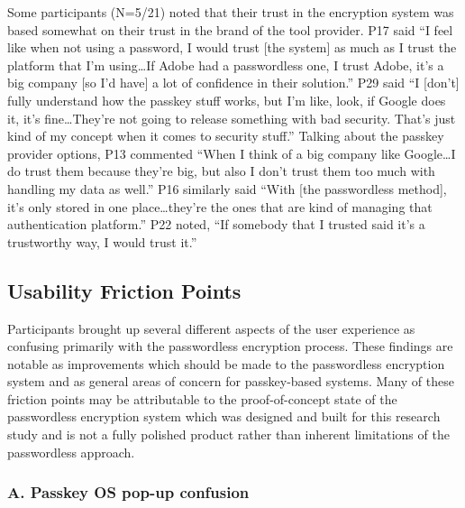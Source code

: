 Some participants (N=5/21) noted that their trust in the encryption system was based somewhat on their trust in the brand of the tool provider. P17 said ``I feel like when not using a password, I would trust [the system] as much as I trust the platform that I'm using\ldots If Adobe had a passwordless one, I trust Adobe, it's a big company [so I'd have] a lot of confidence in their solution.'' P29 said ``I [don't] fully understand how the passkey stuff works, but I'm like, look, if Google does it, it's fine\ldots They're not going to release something with bad security. That's just kind of my concept when it comes to security stuff.'' Talking about the passkey provider options, P13 commented ``When I think of a big company like Google\ldots I do trust them because they're big, but also I don't trust them too much with handling my data as well.'' P16 similarly said ``With [the passwordless method], it's only stored in one place\ldots they're the ones that are kind of managing that authentication platform.'' P22 noted, ``If somebody that I trusted said it's a trustworthy way, I would trust it.''

\subsection{Usability Friction Points}
\label{sec:usability-friction}

Participants brought up several different aspects of the user experience as confusing primarily with the passwordless encryption process. These findings are notable as improvements which should be made to the passwordless encryption system and as general areas of concern for passkey-based systems. Many of these friction points may be attributable to the proof-of-concept state of the passwordless encryption system which was designed and built for this research study and is not a fully polished product rather than inherent limitations of the passwordless approach.

\subsubsection*{A. Passkey OS pop-up confusion}

